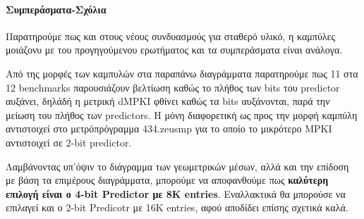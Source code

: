 \paragraph{Συμπεράσματα-Σχόλια}
   Παρατηρούμε πως και στους νέους συνδυασμούς για σταθερό υλικό, η καμπύλες 
   μοιάζονυ με του προγηγούμενου ερωτήματος και τα συμπεράσματα είναι ανάλογα.

    Από της μορφές των καμπυλών στα παραπάνω διαγράμματα παρατηρούμε πως 11 στα
    12 benchmarks παρουσιάζουν βελτίωση καθώς το πλήθος των bits του predictor
    αυξάνει, δηλάδή η μετρική dMPKI φθίνει καθώς τα bits αυξάνονται, παρά την
    μείωση του πλήθος των predictors. Η μόνη διαφορετική ως προς την μορφή
    καμπύλη αντιστοιχεί στο μετρόπρόγραμμα 434.zeusmp για το οποίο το μικρότερο
    MPKI αντιστοιχεί σε 2-bit predictor.

   Λαμβάνοντας υπ'όψιν το διάγραμμα των γεωμετρικών μέσων, αλλά και την επίδοση
   με βάση τα επιμέρους διαγράμματα, μπορούμε να αποφανθούμε πως
   \textbf{καλύτερη επιλογή είναι ο 4-bit Predictor με 8Κ entries}. Εναλλακτικά
   θα μπορούσε να επιλαγεί και ο 2-bit Predicotr με 16Κ entries, αφού αποδίδει
   επίσης σχετικά καλά.

